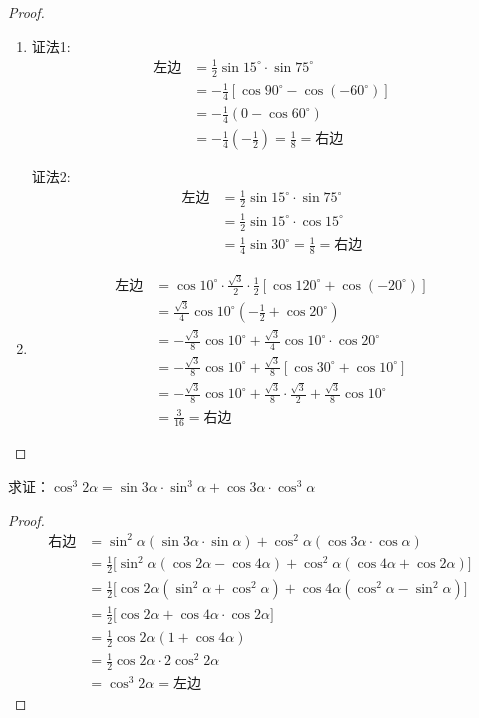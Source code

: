 \begin{proof}
\begin{enumerate}
    \item 证法1:
\[\begin{split}
\text{左边}&=\frac{1}{2}\sin 15^{\circ}\cdot \sin 75^{\circ}\\
&=-\frac{1}{4}[\cos 90^{\circ}-\cos(-60^{\circ})]\\
&=-\frac{1}{4}(0-\cos60^{\circ})\\
&=-\frac{1}{4}\left(-\frac{1}{2}\right)=\frac{1}{8}=\text{右边}    
\end{split}\]

证法2:
\[\begin{split}
\text{左边}&=\frac{1}{2}\sin 15^{\circ}\cdot \sin 75^{\circ}\\
&=\frac{1}{2}\sin 15^{\circ}\cdot \cos15^{\circ}\\
&=\frac{1}{4}\sin 30^{\circ}=\frac{1}{8}=\text{右边}    
\end{split}\]

\item 
\[\begin{split}
\text{左边}&=\cos 10^{\circ}\cdot \frac{\sqrt{3}}{2}\cdot \frac{1}{2}[\cos 120^{\circ}+\cos(-20^{\circ})]\\
&=\frac{\sqrt{3}}{4}\cos 10^{\circ}\left(-\frac{1}{2}+\cos20^{\circ}\right)\\ 
&=-\frac{\sqrt{3}}{8}\cos 10^{\circ}+\frac{\sqrt{3}}{4}\cos 10^{\circ}\cdot \cos 20^{\circ}\\
&=-\frac{\sqrt{3}}{8}\cos 10^{\circ}+\frac{\sqrt{3}}{8}[\cos30^{\circ}+\cos10^{\circ}]\\
&=-\frac{\sqrt{3}}{8}\cos 10^{\circ}+\frac{\sqrt{3}}{8}\cdot \frac{\sqrt{3}}{2}+\frac{\sqrt{3}}{8}\cos 10^{\circ}\\
&=\frac{3}{16}=\text{右边}
\end{split}\]
\end{enumerate}
\end{proof}

\begin{example}
求证：$\cos^3 2\alpha= \sin 3\alpha\cdot \sin^3\alpha+\cos 3\alpha\cdot \cos^3\alpha$
\end{example}

\begin{proof}
\[\begin{split}
\text{右边}&=\sin^2\alpha(\sin3\alpha\cdot \sin\alpha)+\cos^2\alpha(\cos3\alpha\cdot\cos\alpha)\\
&=\frac{1}{2}\big[\sin^2\alpha(\cos2\alpha-\cos4\alpha)+\cos^2\alpha(\cos4\alpha+\cos2\alpha)\big]\\
&=\frac{1}{2}\big[\cos 2\alpha(\sin^2\alpha+\cos^2\alpha)+\cos4\alpha(\cos^2\alpha-\sin^2\alpha)\big]\\
&=\frac{1}{2}\big[\cos2\alpha+\cos4\alpha\cdot\cos2\alpha\big]\\
&=\frac{1}{2}\cos2\alpha(1+\cos4\alpha)\\
&=\frac{1}{2}\cos2\alpha\cdot 2\cos^2 2\alpha\\
&=\cos^3 2\alpha=\text{左边}
\end{split}\]
\end{proof}

